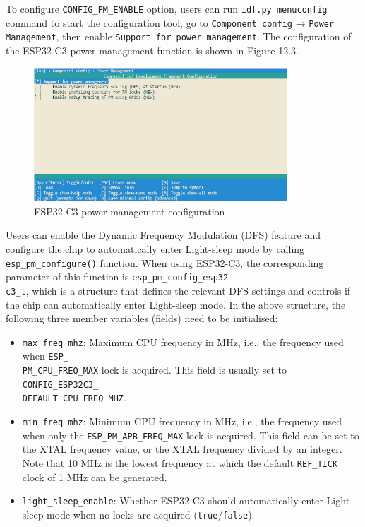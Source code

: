 \documentclass[a4paper,12pt,openany]{book}
\begin{document}
To configure \verb|CONFIG_PM_ENABLE| option, users can run \verb|idf.py menuconfig| command to start the configuration tool, go to \verb|Component config| → \verb|Power Management|, then enable \verb|Support for power management|. The configuration of the ESP32-C3 power management function is shown in Figure 12.3.

\begin{figure}[!h]
    \centering
    \includegraphics[width=0.85\textwidth]{D12Z/12-3}
    \caption{ESP32-C3 power management configuration}
\end{figure}

Users can enable the Dynamic Frequency Modulation (DFS) feature and configure the chip to automatically enter Light-sleep mode by calling \verb|esp_pm_configure()| function. When using ESP32-C3, the corresponding parameter of this function is \verb|esp_pm_config_esp32|\\ \verb|c3_t|, which is a structure that defines the relevant DFS settings and controls if the chip can automatically enter Light-sleep mode. In the above structure, the following three member variables (fields) need to be initialised:

\begin{itemize}[leftmargin=1em]
    \item \verb|max_freq_mhz|: Maximum CPU frequency in MHz, i.e., the frequency used when \verb|ESP_|\\ \verb|PM_CPU_FREQ_MAX| lock is acquired. This field is usually set to \verb|CONFIG_ESP32C3_|\\ \verb|DEFAULT_CPU_FREQ_MHZ|.
    \item \verb|min_freq_mhz|: Minimum CPU frequency in MHz, i.e., the frequency used when only the \verb|ESP_PM_APB_FREQ_MAX| lock is acquired. This field can be set to the XTAL frequency value, or the XTAL frequency divided by an integer. Note that 10 MHz is the lowest frequency at which the default \verb|REF_TICK| clock of 1 MHz can be generated.
    \item \verb|light_sleep_enable|: Whether ESP32-C3 should automatically enter Light-sleep mode when no locks are acquired (\verb|true|/\verb|false|).
\end{itemize}
\end{document}
